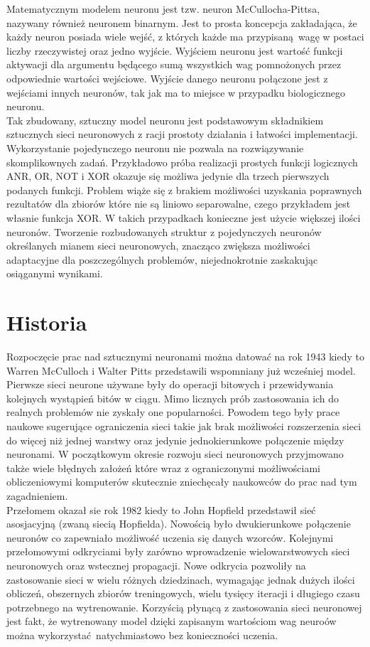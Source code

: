 Matematycznym modelem neuronu jest tzw. neuron McCullocha-Pittsa, nazywany
również neuronem binarnym. Jest to prosta koncepcja zakładająca, że każdy neuron
posiada wiele wejść, z których każde ma przypisaną wagę w postaci liczby
rzeczywistej oraz jedno wyjście. Wyjściem neuronu jest wartość funkcji aktywacji
dla argumentu będącego sumą wszystkich wag pomnożonych przez odpowiednie
wartości wejściowe. Wyjście danego neuronu połączone jest z wejściami innych
neuronów, tak jak ma to miejsce w przypadku biologicznego neuronu.\\
Tak zbudowany, sztuczny model neuronu jest podstawowym składnikiem sztucznych sieci
neuronowych z racji prostoty działania i łatwości implementacji.\\
Wykorzystanie pojedynczego neuronu nie pozwala na rozwiązywanie skomplikownych zadań.
Przykładowo próba realizacji prostych funkcji logicznych ANR, OR, NOT i XOR okazuje
się możliwa jedynie dla trzech pierwszych podanych funkcji. Problem wiąże się z
brakiem możliwości uzyskania poprawnych rezultatów dla zbiorów które nie są liniowo
separowalne, czego przykładem jest własnie funkcja XOR. W takich przypadkach konieczne
jest użycie większej ilości neuronów. Tworzenie rozbudowanych struktur z pojedynczych
neuronów określanych mianem sieci neuronowych, znacząco zwiększa możliwości adaptacyjne
dla poszczególnych problemów, niejednokrotnie zaskakując osiąganymi wynikami.


\section{Historia}

Rozpoczęcie prac nad sztucznymi neuronami można datować na rok 1943 kiedy to
Warren McCulloch i Walter Pitts przedstawili wspomniany już wcześniej model.
Pierwsze sieci neurone używane były do operacji bitowych i przewidywania kolejnych
wystąpień bitów w ciągu. Mimo licznych prób zastosowania ich do realnych problemów
nie zyskały one popularności. Powodem tego były prace naukowe sugerujące ograniczenia
sieci takie jak brak możliwości rozszerzenia sieci do więcej niż jednej warstwy oraz
jedynie jednokierunkowe połączenie między neuronami. W początkowym okresie rozwoju
sieci neuronowych przyjmowano także wiele błędnych założeń które wraz z ograniczonymi
możliwościami obliczeniowymi komputerów skutecznie zniechęcały naukowców do prac
nad tym zagadnieniem.\\
Przełomem okazał sie rok 1982 kiedy to John Hopfield przedstawił sieć asosjacyjną
(zwaną siecią Hopfielda). Nowością było dwukierunkowe połączenie neuronów co
zapewniało możliwość uczenia się danych wzorców. Kolejnymi przełomowymi odkryciami
były zarówno wprowadzenie wielowarstwowych sieci neuronowych oraz wstecznej
propagacji. Nowe odkrycia pozwoliły na zastosowanie sieci w wielu różnych
dziedzinach, wymagając jednak dużych ilości obliczeń, obszernych zbiorów
treningowych, wielu tysięcy iteracji i długiego czasu potrzebnego na wytrenowanie.
Korzyścią płynącą z zastosowania sieci neuronowej jest fakt, że wytrenowany model
dzięki zapisanym wartościom wag neuroów można wykorzystać natychmiastowo bez konieczności
uczenia.
